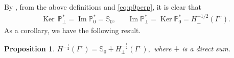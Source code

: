 \documentclass[]{article}
\newtheorem{proposition}{Proposition}
\numberwithin{equation}{section}
\numberwithin{theorem}{section}
\numberwithin{lemma}{section}
\numberwithin{corollary}{section}
\numberwithin{proposition}{section}
\numberwithin{definition}{section}
\newcommand{\re}{\varepsilon}
\renewcommand{\Im}{\operatorname{Im}}
\begin{document}
	By \cite[p. 23, Lemma 2.10]{mclean}, from the above definitions and \eqref{eq:p0perp}, it is clear that
	\begin{align*}%
		&\operatorname{Ker} \, \mathbb{P}^*_{\perp} = \operatorname{Im }\mathbb{P}^*_0=\mathbb{S}_0, &&\operatorname{Im}\mathbb{P}^*_{\perp} = \operatorname{Ker} \mathbb{P}^*_0=H^{-1/2}_{\perp}(\Gamma^{\re}). 
	\end{align*}
	As a corollary,  we have the following result.
	\begin{proposition}
		\label{ortho_decompositionHm12}
		$
		H^{-\frac{1}{2}}(\Gamma^{\re})=\mathbb{S}_0\dotplus H^{-\frac{1}{2}}_{\perp} (\Gamma^{\re}), $ where $\dotplus$ is a direct sum. 
	\end{proposition}
\end{document}
